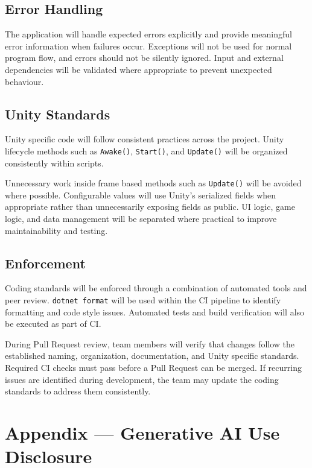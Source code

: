 \documentclass{article}
\begin{document}
\subsection{Error Handling}

The application will handle expected errors explicitly and provide
meaningful error information when failures occur. Exceptions will not be
used for normal program flow, and errors should not be silently ignored.
Input and external dependencies will be validated where appropriate to
prevent unexpected behaviour.


\subsection{Unity Standards}

Unity specific code will follow consistent practices across the project.
Unity lifecycle methods such as \texttt{Awake()}, \texttt{Start()}, and
\texttt{Update()} will be organized consistently within scripts.

Unnecessary work inside frame based methods such as \texttt{Update()} will
be avoided where possible. Configurable values will use Unity's serialized
fields when appropriate rather than unnecessarily exposing fields as
public. UI logic, game logic, and data management will be separated where
practical to improve maintainability and testing.


\subsection{Enforcement}

Coding standards will be enforced through a combination of automated tools
and peer review. \texttt{dotnet format} will be used within the CI pipeline
to identify formatting and code style issues. Automated tests and build
verification will also be executed as part of CI.

During Pull Request review, team members will verify that changes follow
the established naming, organization, documentation, and Unity specific
standards. Required CI checks must pass before a Pull Request can be
merged. If recurring issues are identified during development, the team
may update the coding standards to address them consistently.

\newpage{}

\section{Appendix --- Generative AI Use Disclosure}
\end{document}
